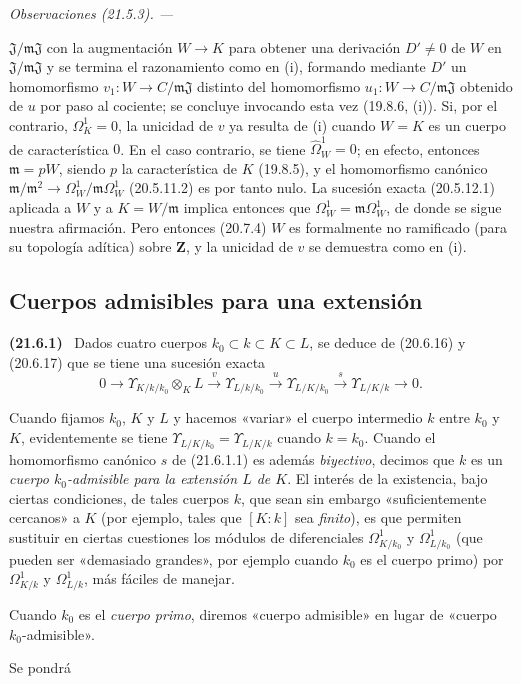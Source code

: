 \documentclass[10pt,oneside]{book}
\makeatletter
\newcommand{\setmanualcurrentlabel}[1]{\def\@currentlabel{#1}}
\newcommand{\oldpage}[2][]{%
  \setcounter{footnote}{0}%
  \marginpar{\scriptsize\textbf{#1}~|~#2}\ignorespaces}
\newenvironment{env}[1][]{\setmanualcurrentlabel{#1}\par\medskip\noindent\textbf{(#1)}\ }{\par}
\newenvironment{remarks}[1][]{%
  \setmanualcurrentlabel{#1}\par\medskip\noindent\itshape Observaciones (#1). ---\ }{\par}
\makeatother
\begin{document}
\begin{remarks}[21.5.3]
\begin{enumerate}
  $\mathfrak J/\mathfrak m\mathfrak J$ con la augmentación $W\to K$ para
  obtener una derivación $D'\ne0$ de $W$ en
  $\mathfrak J/\mathfrak m\mathfrak J$ y se termina el razonamiento como
  en (i), formando mediante $D'$ un homomorfismo
  $v_1:W\to C/\mathfrak m\mathfrak J$ distinto del homomorfismo
  $u_1:W\to C/\mathfrak m\mathfrak J$ obtenido de $u$ por paso al cociente;
  se concluye invocando esta vez (19.8.6, (i)). Si, por el contrario,
  $\Omega^1_K=0$, la unicidad de $v$ ya resulta de (i) cuando $W=K$ es un
  cuerpo de característica $0$. En el caso contrario, se tiene
  $\widehat{\Omega}^1_W=0$; en efecto, entonces $\mathfrak m=pW$, siendo $p$
  la característica de $K$ (19.8.5), y el homomorfismo canónico
  $\mathfrak m/\mathfrak m^2\to\Omega^1_W/\mathfrak m\Omega^1_W$ (20.5.11.2)
  es por tanto nulo. La sucesión exacta (20.5.12.1) aplicada a $W$ y a
  $K=W/\mathfrak m$ implica entonces que $\Omega^1_W=\mathfrak m\Omega^1_W$,
  de donde se sigue nuestra afirmación. Pero entonces (20.7.4) $W$ es
  formalmente no ramificado (para su topología adítica) sobre $\mathbf Z$, y la
  unicidad de $v$ se demuestra como en (i).
\end{enumerate}
\end{remarks}

\oldpage[0\textsubscript{IV-1}]{167}
\subsection{Cuerpos admisibles para una extensión}
\label{section:0.21.6-es}

\begin{env}[21.6.1]
\label{0.21.6.1-es}
Dados cuatro cuerpos $k_0\subset k\subset K\subset L$, se deduce de
(20.6.16) y (20.6.17) que se tiene una sucesión exacta
\begin{equation}
\tag{21.6.1.1}
\label{0.21.6.1.1-es}
0\to\Upsilon_{K/k/k_0}\otimes_KL\xrightarrow{v}\Upsilon_{L/k/k_0}
\xrightarrow{u}\Upsilon_{L/K/k_0}\xrightarrow{s}\Upsilon_{L/K/k}\to0.
\end{equation}

Cuando fijamos $k_0$, $K$ y $L$ y hacemos «variar» el cuerpo intermedio
$k$ entre $k_0$ y $K$, evidentemente se tiene
$\Upsilon_{L/K/k_0}=\Upsilon_{L/K/k}$ cuando $k=k_0$. Cuando el homomorfismo
canónico $s$ de (21.6.1.1) es además \emph{biyectivo}, decimos que $k$ es un \emph{cuerpo
$k_0$-admisible para la extensión $L$ de $K$}. El interés de la existencia, bajo
ciertas condiciones, de tales cuerpos $k$, que sean sin embargo
«suficientemente cercanos» a $K$ (por ejemplo, tales que $[K:k]$ sea \emph{finito}), es
que permiten sustituir en ciertas cuestiones los módulos de diferenciales
$\Omega^1_{K/k_0}$ y $\Omega^1_{L/k_0}$ (que pueden ser «demasiado grandes»,
por ejemplo cuando $k_0$ es el cuerpo primo) por
$\Omega^1_{K/k}$ y $\Omega^1_{L/k}$, más fáciles de manejar.

Cuando $k_0$ es el \emph{cuerpo primo}, diremos «cuerpo admisible» en lugar
de «cuerpo $k_0$-admisible».
 
Se pondrá
\end{env}
\end{document}
